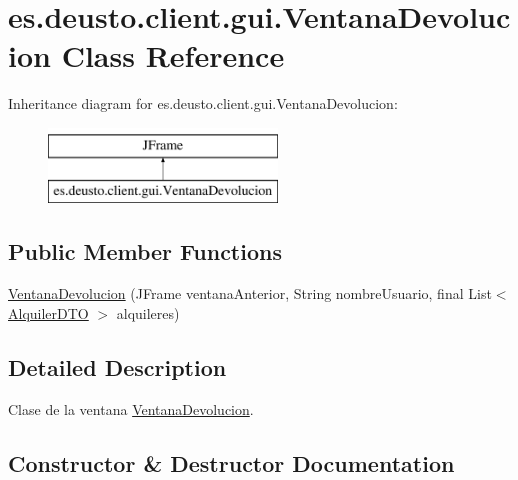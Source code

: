 \hypertarget{classes_1_1deusto_1_1client_1_1gui_1_1_ventana_devolucion}{}\section{es.\+deusto.\+client.\+gui.\+Ventana\+Devolucion Class Reference}
\label{classes_1_1deusto_1_1client_1_1gui_1_1_ventana_devolucion}
Inheritance diagram for es.\+deusto.\+client.\+gui.\+Ventana\+Devolucion\+:\begin{figure}[H]
\begin{center}
\leavevmode
\includegraphics[height=2.000000cm]{classes_1_1deusto_1_1client_1_1gui_1_1_ventana_devolucion}
\end{center}
\end{figure}
\subsection*{Public Member Functions}
\begin{DoxyCompactItemize}
\item 
\mbox{\hyperlink{classes_1_1deusto_1_1client_1_1gui_1_1_ventana_devolucion_ae9d4bd6937c4cf48f2a9ff0f7680a8bb}{Ventana\+Devolucion}} (J\+Frame ventana\+Anterior, String nombre\+Usuario, final List$<$ \mbox{\hyperlink{classes_1_1deusto_1_1server_1_1dto_1_1_alquiler_d_t_o}{Alquiler\+D\+TO}} $>$ alquileres)
\end{DoxyCompactItemize}


\subsection{Detailed Description}
Clase de la ventana \mbox{\hyperlink{classes_1_1deusto_1_1client_1_1gui_1_1_ventana_devolucion}{Ventana\+Devolucion}}. 

\subsection{Constructor \& Destructor Documentation}
\mbox{\label{classes_1_1deusto_1_1client_1_1gui_1_1_ventana_devolucion_ae9d4bd6937c4cf48f2a9ff0f7680a8bb}} 
